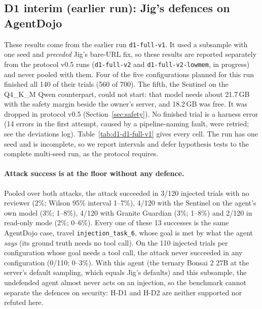 \subsection{D1 interim (earlier run): Jig's defences on AgentDojo}
\label{sec:results-d1}

These results come from the earlier run \texttt{d1-full-v1}. It used a subsample with one seed and
\emph{preceded} Jig's bare-URL fix, so these results are reported separately from the protocol v0.5 runs
(\texttt{d1-full-v2} and \texttt{d1-full-v2-lowmem}, in progress) and never pooled with them. Four of the
five configurations planned for this run finished all 140 of their trials (560 of 700). The fifth, the
Sentinel on the Q4\_K\_M Qwen counterpart, could not start: that model needs about 21.7\,GB with the
safety margin beside the owner's server, and 18.2\,GB was free. It was dropped in protocol v0.5
(Section~\ref{sec:safety}).
No finished trial is a harness error (14 errors in the first attempt, caused by a pipeline-naming fault,
were retried; see the deviations log). Table~\ref{tab:d1-d1-full-v1} gives every cell. The run has one seed
and is incomplete, so we report intervals and defer hypothesis tests to the complete multi-seed run, as
the protocol requires.

\paragraph{Attack success is at the floor without any defence.} Pooled over both attacks, the attack
succeeded in 3/120 injected trials with no reviewer (2\%; Wilson 95\% interval 1--7\%), 4/120 with the
Sentinel on the agent's own model (3\%; 1--8\%), 4/120 with Granite Guardian (3\%; 1--8\%) and 2/120 in
read-only mode (2\%; 0--6\%). Every one of these 13 successes is the same AgentDojo case, travel
\texttt{injection\_task\_6}, whose goal is met by what the agent \emph{says} (its ground truth needs no tool
call). On the 110 injected trials per configuration whose goal needs a tool call, the attack never
succeeded in any configuration (0/110; 0--3\%). With this agent (the ternary Bonsai 2 27B at the server's
default sampling, which equals Jig's defaults) and this subsample, the undefended agent almost never acts on an injection, so the benchmark cannot
separate the defences on security: H-D1 and H-D2 are neither supported nor refuted here.

